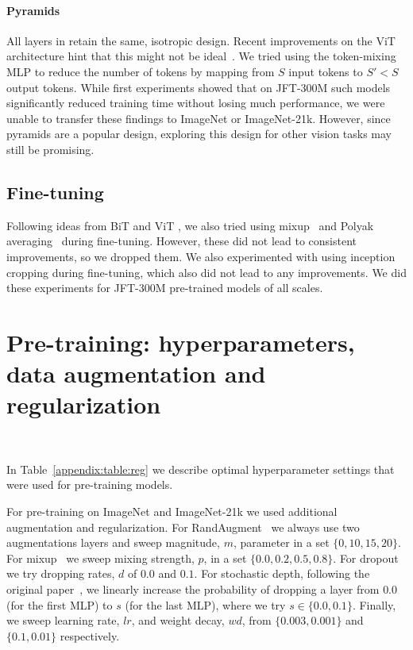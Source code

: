 \paragraph{Pyramids}
All layers in \name{} retain the same, isotropic design.
Recent improvements on the ViT architecture hint that this might not be ideal~\citep{wang2021pyramid}.
We tried using the token-mixing MLP to reduce the number of tokens by mapping from $S$ input tokens to $S' < S$ output tokens.
While first experiments showed that on JFT-300M such models significantly reduced training time without losing much performance, we were unable to transfer these findings to ImageNet or ImageNet-21k.
However, since pyramids are a popular design, exploring this design for other vision tasks may still be promising.

\subsection{Fine-tuning}
Following ideas from BiT \cite{kolesnikov2020-bit} and ViT \cite{Dosovitskiy2021}, we also tried using mixup~\cite{zhang2018mixup} and Polyak averaging~\cite{polyak} during fine-tuning. 
However, these did not lead to consistent improvements, so we dropped them. 
We also experimented with using inception cropping \cite{szegedy15inception} during fine-tuning, which also did not lead to any improvements.
We did these experiments for JFT-300M pre-trained \name{} models of all scales.


\section{Pre-training: hyperparameters, data augmentation and regularization}~\label{appendix:sec:reg}

In Table~\ref{appendix:table:reg} we describe 
optimal hyperparameter settings that were used for pre-training \name{} models.

For pre-training on ImageNet and ImageNet-21k we used additional augmentation and regularization.
For RandAugment~\cite{cubuk2020rand} we always use two augmentations layers and sweep magnitude, $m$, parameter in a set $\{0, 10, 15, 20\}$. For mixup~\cite{zhang2018mixup} we sweep mixing strength, $p$, in a set $\{0.0, 0.2, 0.5, 0.8\}$. For dropout~\cite{srivastava14dropout} we try dropping rates, $d$ of $0.0$ and $0.1$. For stochastic depth, following the original paper~\cite{huang2016deep}, we linearly increase the probability of dropping a layer from $0.0$ (for the first MLP) to $s$ (for the last MLP), where we try $s \in \{0.0, 0.1\}$. Finally, we sweep learning rate, $lr$, and weight decay, $wd$, from $\{0.003, 0.001\}$ and $\{0.1, 0.01\}$ respectively. 

